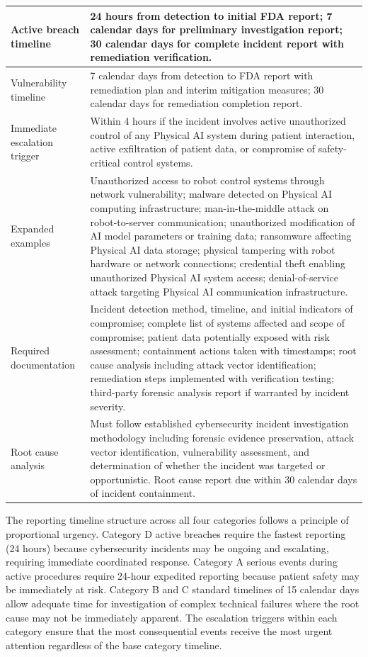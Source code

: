 \begin{table}[H]
\begin{tabularx}{\textwidth}{l X}
\midrule
Active breach timeline & 24 hours from detection to initial FDA report; 7 calendar days for preliminary investigation report; 30 calendar days for complete incident report with remediation verification. \\
\midrule
Vulnerability timeline & 7 calendar days from detection to FDA report with remediation plan and interim mitigation measures; 30 calendar days for remediation completion report. \\
\midrule
Immediate escalation trigger & Within 4 hours if the incident involves active unauthorized control of any Physical AI system during patient interaction, active exfiltration of patient data, or compromise of safety-critical control systems. \\
\midrule
Expanded examples & Unauthorized access to robot control systems through network vulnerability; malware detected on Physical AI computing infrastructure; man-in-the-middle attack on robot-to-server communication; unauthorized modification of AI model parameters or training data; ransomware affecting Physical AI data storage; physical tampering with robot hardware or network connections; credential theft enabling unauthorized Physical AI system access; denial-of-service attack targeting Physical AI communication infrastructure. \\
\midrule
Required documentation & Incident detection method, timeline, and initial indicators of compromise; complete list of systems affected and scope of compromise; patient data potentially exposed with risk assessment; containment actions taken with timestamps; root cause analysis including attack vector identification; remediation steps implemented with verification testing; third-party forensic analysis report if warranted by incident severity. \\
\midrule
Root cause analysis & Must follow established cybersecurity incident investigation methodology including forensic evidence preservation, attack vector identification, vulnerability assessment, and determination of whether the incident was targeted or opportunistic. Root cause report due within 30 calendar days of incident containment. \\
\bottomrule
\end{tabularx}
\end{table}

The reporting timeline structure across all four categories follows a principle
of proportional urgency. Category D active breaches require the fastest
reporting (24 hours) because cybersecurity incidents may be ongoing and
escalating, requiring immediate coordinated response. Category A serious events
during active procedures require 24-hour expedited reporting because patient
safety may be immediately at risk. Category B and C standard timelines of 15
calendar days allow adequate time for investigation of complex technical
failures where the root cause may not be immediately apparent. The escalation
triggers within each category ensure that the most consequential events receive
the most urgent attention regardless of the base category timeline.

